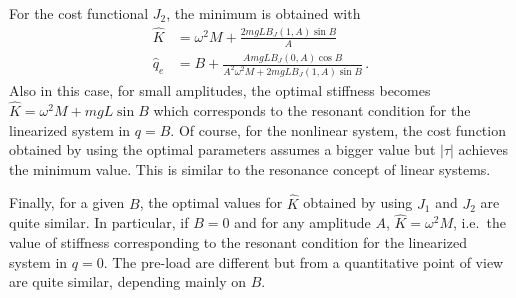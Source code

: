 For the cost functional $J_2$, %
the minimum is obtained with 
\[
\begin{aligned}
\hat K &= \omega^2 M+\frac{2mgLB_J(1,A)\sin B}{A}\\
\hat q_e &= B+\frac{AmgLB_J(0,A)\cos B}{A^2\omega^2 M+2mgLB_J(1,A)\sin B}\,.
\end{aligned}
\]
Also in this case, for small amplitudes, the optimal stiffness becomes $\hat K=\omega^2 M+mgL\sin B$ which corresponds to the resonant condition for the linearized system in $q=B$. %
Of course, for the nonlinear system, the cost function obtained by using the optimal parameters assumes a bigger value but $|\tau|$ achieves the minimum value. This is similar to the resonance concept of linear systems.

Finally, for a given $B$, the optimal values for $\hat K$ obtained by using $J_1$ and $J_2$ are quite similar. In particular, if $B=0$ and for any amplitude $A$, $\hat K=\omega^2 M$, i.e.~the value of stiffness corresponding to the resonant condition for the linearized system in $q=0$. The pre-load are different but from a quantitative point of view are quite similar, depending mainly on $B$.

